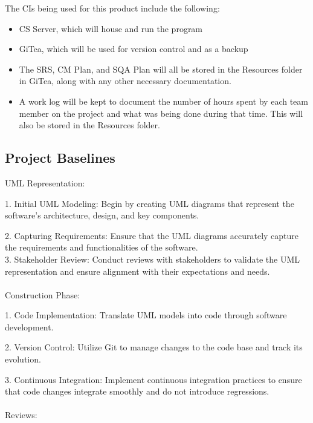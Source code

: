 \documentclass[letterpaper,12pt,oneside,listof=totoc]{scrreprt}
\begin{document}
The CIs being used for this product include the following:
\begin{itemize}
    \item CS Server, which will house and run the program
    \item GiTea, which will be used for version control and as a backup 
    \item The SRS, CM Plan, and SQA Plan will all be stored in the Resources folder in GiTea, along with any other necessary documentation.
    \item A work log will be kept to document the number of hours spent by each team member on the project and what was being done during that time. This will also be stored in the Resources folder.
\end{itemize}

\subsection{Project Baselines}

UML Representation:

1. Initial UML Modeling: Begin by creating UML diagrams that represent the software's architecture, design, and key components.

2. Capturing Requirements: Ensure that the UML diagrams accurately capture the requirements and functionalities of the software.\\

3. Stakeholder Review: Conduct reviews with stakeholders to validate the UML representation and ensure alignment with their expectations and needs.\\\\Construction Phase:

1. Code Implementation: Translate UML models into code through software development.

2. Version Control: Utilize Git to manage changes to the code base and track its evolution.

3. Continuous Integration: Implement continuous integration practices to ensure that code changes integrate smoothly and do not introduce regressions.\\\\Reviews:
\end{document}
